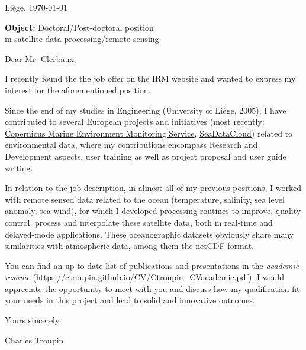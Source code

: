 \documentclass[10pt,a4paper,svgnames]{article}
\newcommand{\imp}[1]{\textcolor{CVblue}{\bf #1}}
\begin{document}
 
\pagestyle{empty}

\hfill Liège, \today 

\vspace{1cm}

\noindent\imp{Object:} Doctoral/Post-doctoral position\\ 
in satellite data processing/remote sensing 



\vspace{1cm}

Dear Mr. Clerbaux,

\vspace{1cm}


I recently found the the job offer on the IRM website and wanted to express my interest for the aforementioned position. 

Since the end of my studies in Engineering (University of Liège, 2005), I have contributed to several European projects and initiatives (most recently: \href{http://marine.copernicus.eu}{Copernicus Marine Environment Monitoring Service}, \href{http://www.seadatanet.org}{SeaDataCloud}) related to environmental data, where my contributions encompass Research and Development aspects, user training as well as project proposal and user guide writing.

In relation to the job description, in almost all of my previous positions, I worked with remote sensed data related to the ocean (temperature, salinity, sea level anomaly, sea wind), for which I developed processing routines to improve, quality control, process and interpolate these satellite data, both in real-time and delayed-mode applications. These oceanographic datasets obviously share many similarities with atmospheric data, among them the netCDF format. 

You can find an up-to-date list of publications and presentations in the \textit{academic resume} (\url{https://ctroupin.github.io/CV/Ctroupin_CVacademic.pdf}). I would appreciate the opportunity to meet with you and discuss how my qualification fit your needs in this project and lead to solid and innovative outcomes.

 

\vspace{1cm}
Yours sincerely


\vspace{2cm}

\hfill Charles Troupin
\end{document}
